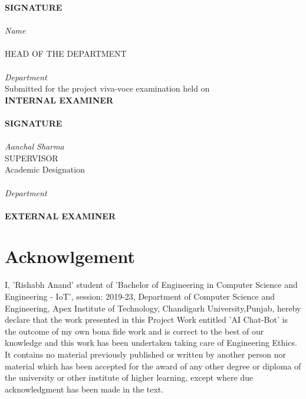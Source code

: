 \documentclass[14pt]{extarticle}
\begin{document}
\begin{multicols*}{2}
\begin{center}
\vspace*{5em}
\textbf{SIGNATURE}\\
\phantom{ }\\
\emph{Name}\\
\phantom{ }\\
HEAD OF THE DEPARTMENT\\
\phantom{ }\\
\emph{Department}\\
\vspace{3em}
Submitted for the project viva-voce examination held on\\
\vspace{5em}
\textbf{INTERNAL EXAMINER}\\
\vspace{10em}
\phantom{ }\\
\vspace{6em}
\textbf{SIGNATURE}\\
\phantom{ }\\
\emph{Aanchal Sharma}\\
SUPERVISOR\\
Academic Designation\\
\phantom{ }\\
\emph{Department}\\
\vspace{9em}
\phantom{}\\
\textbf{EXTERNAL EXAMINER}\\
\end{center}
\end{multicols*}

\newpage
\section*{Acknowlgement}

I, 'Rishabh Anand' student of 'Bachelor of Engineering in Computer Science and Engineering - IoT',
session: 2019-23, Department of Computer Science and Engineering, Apex Institute of Technology, Chandigarh University,Punjab,
hereby declare that the work presented in this Project Work entitled 'AI Chat-Bot'
is the outcome of my own bona fide work and is correct to the best of our knowledge
and this work has been undertaken taking care of Engineering Ethics. \\

It contains no material previously published or written by another person
nor material which has been accepted for the award of any other degree or diploma of the university or other institute of higher learning,
except where due acknowledgment has been made in the text.
\end{document}
